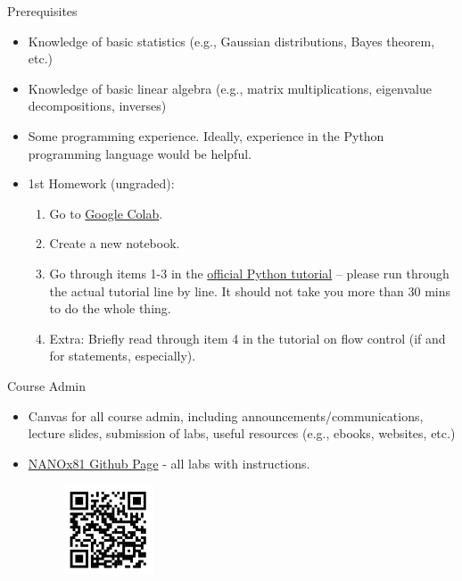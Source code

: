 \documentclass[aspectratio=169]{beamer}
\begin{document}
\begin{frame}{Prerequisites}
    \begin{itemize}
        \item Knowledge of basic statistics (e.g., Gaussian distributions, Bayes theorem, etc.)
        \item Knowledge of basic linear algebra (e.g., matrix multiplications, eigenvalue decompositions, inverses)
        \item Some programming experience. Ideally, experience in the Python programming language would be helpful.
        \item 1st Homework (ungraded):
        \begin{enumerate}
            \item Go to \href{https://colab.research.google.com/}{Google Colab}.
            \item Create a new notebook.
            \item Go through items 1-3 in the \href{http://docs.python.org/3/tutorial/}{official Python tutorial} – please run through the actual tutorial line by line. It should not take you more than 30 mins to do the whole thing.
            \item Extra: Briefly read through item 4 in the tutorial on flow control (if and for statements, especially).
        \end{enumerate}
    \end{itemize}
\end{frame}

\begin{frame}{Course Admin}
    \begin{itemize}
        \item Canvas for all course admin, including announcements/communications, lecture slides, submission of labs, useful resources (e.g., ebooks, websites, etc.)
        \item \href{https://github.com/materialsvirtuallab/nano281}{NANOx81 Github Page} - all labs with instructions.
        \begin{figure}
            \centering
            \includegraphics[width=0.25\textwidth]{figures/QR-NANO281Github.png}
            \label{fig:my_label}
        \end{figure}
    \end{itemize}
\end{frame}
\end{document}
